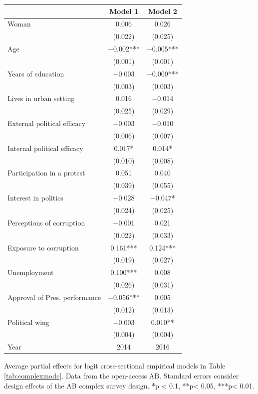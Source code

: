 \documentclass[floatsintext,man]{apa7}\usepackage[]{graphicx}\usepackage[]{color}
\begin{document}
\begin{table}[htbp]
\begin{center}
\begin{tabular}[t]{lcc}
\toprule
  & Model 1 & Model 2\\
\midrule
Woman & \num{0.006} & \num{0.026}\\
 & (\num{0.022}) & (\num{0.025})\\
Age & \num{-0.002}*** & \num{-0.005}***\\
 & (\num{0.001}) & (\num{0.001})\\
Years of education & \num{-0.003} & \num{-0.009}***\\
 & (\num{0.003}) & (\num{0.003})\\
Lives in urban setting & \num{0.016} & \num{-0.014}\\
 & (\num{0.025}) & (\num{0.029})\\
External political efficacy & \num{-0.003} & \num{-0.010}\\
 & (\num{0.006}) & (\num{0.007})\\
Internal political efficacy & \num{0.017}* & \num{0.014}*\\
 & (\num{0.010}) & (\num{0.008})\\
Participation in a protest & \num{0.051} & \num{0.040}\\
 & (\num{0.039}) & (\num{0.055})\\
Interest in politics & \num{-0.028} & \num{-0.047}*\\
 & (\num{0.024}) & (\num{0.025})\\
Perceptions of corruption & \num{-0.001} & \num{0.021}\\
 & (\num{0.022}) & (\num{0.033})\\
Exposure to corruption & \num{0.161}*** & \num{0.124}***\\
 & (\num{0.019}) & (\num{0.027})\\
Unemployment & \num{0.100}*** & \num{0.008}\\
 & (\num{0.026}) & (\num{0.031})\\
Approval of Pres. performance & \num{-0.056}*** & \num{0.005}\\
 & (\num{0.012}) & (\num{0.013})\\
Political wing & \num{-0.003} & \num{0.010}**\\
 & (\num{0.004}) & (\num{0.004})\\
Year & 2014 & 2016\\
\bottomrule
\end{tabular}


\end{center}
Average partial effects for logit cross-sectional empirical models in Table \ref{tab:complexmodc}. Data from the open-access AB. Standard errors consider design effects of the AB complex survey design. 
*p < 0.1, **p< 0.05, ***p< 0.01.
\end{table}
\end{document}
